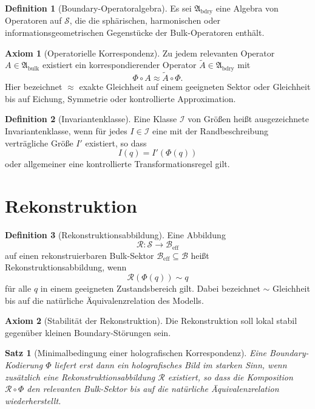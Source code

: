 \documentclass[11pt,a4paper]{article}
\newtheorem{satz}{Satz}
\theoremstyle{definition}
\newtheorem{definition}{Definition}
\newtheorem{axiom}{Axiom}
\theoremstyle{remark}
\begin{document}
\begin{definition}[Boundary-Operatoralgebra]
Es sei $\mathfrak{A}_{\mathrm{bdry}}$ eine Algebra von Operatoren auf $\mathcal{S}$, die die sphärischen, harmonischen oder informationsgeometrischen Gegenstücke der Bulk-Operatoren enthält.
\end{definition}

\begin{axiom}[Operatorielle Korrespondenz]
Zu jedem relevanten Operator $A\in\mathfrak{A}_{\mathrm{bulk}}$ existiert ein korrespondierender Operator $\widetilde A\in\mathfrak{A}_{\mathrm{bdry}}$ mit
\[
\Phi\circ A\approx \widetilde A\circ\Phi.
\]
Hier bezeichnet $\approx$ exakte Gleichheit auf einem geeigneten Sektor oder Gleichheit bis auf Eichung, Symmetrie oder kontrollierte Approximation.
\end{axiom}

\begin{definition}[Invariantenklasse]
Eine Klasse $\mathcal{I}$ von Größen heißt ausgezeichnete Invariantenklasse, wenn für jedes $I\in\mathcal{I}$ eine mit der Randbeschreibung verträgliche Größe $I'$ existiert, so dass
\[
I(q)=I'(\Phi(q))
\]
oder allgemeiner eine kontrollierte Transformationsregel gilt.
\end{definition}

\section{Rekonstruktion}

\begin{definition}[Rekonstruktionsabbildung]
Eine Abbildung
\[
\mathcal{R}:\mathcal{S}\to\mathcal{B}_{\mathrm{eff}}
\]
auf einen rekonstruierbaren Bulk-Sektor $\mathcal{B}_{\mathrm{eff}}\subseteq\mathcal{B}$ heißt Rekonstruktionsabbildung, wenn
\[
\mathcal{R}(\Phi(q))\sim q
\]
für alle $q$ in einem geeigneten Zustandsbereich gilt. Dabei bezeichnet $\sim$ Gleichheit bis auf die natürliche Äquivalenzrelation des Modells.
\end{definition}

\begin{axiom}[Stabilität der Rekonstruktion]
Die Rekonstruktion soll lokal stabil gegenüber kleinen Boundary-Störungen sein.
\end{axiom}

\begin{satz}[Minimalbedingung einer holografischen Korrespondenz]
Eine Boundary-Kodierung $\Phi$ liefert erst dann ein holografisches Bild im starken Sinn, wenn zusätzlich eine Rekonstruktionsabbildung $\mathcal{R}$ existiert, so dass die Komposition $\mathcal{R}\circ\Phi$ den relevanten Bulk-Sektor bis auf die natürliche Äquivalenzrelation wiederherstellt.
\end{satz}
\end{document}
